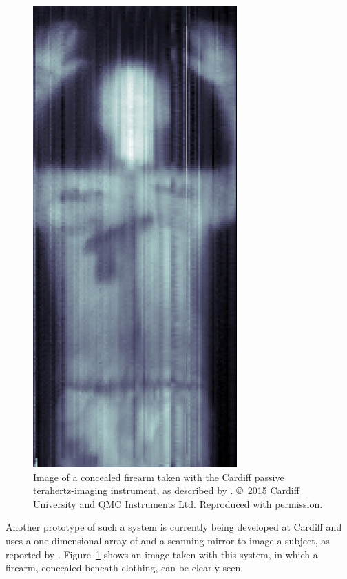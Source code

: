 \par 
\begin{figure}[tb]
\begin{center}
\includegraphics[height = 0.4\textheight]{figures/kidCAM_image}
\caption[Image of a concealed firearm taken with the Cardiff passive terahertz-imaging instrument]{Image of a concealed firearm taken with the Cardiff passive terahertz-imaging instrument, as described by \textcite{Rowe2015}. \copyright~2015 Cardiff University and QMC Instruments Ltd. Reproduced with permission.}
\label{fig:KIDcam}
\end{center}
\end{figure}
Another prototype of such a system is currently being developed at Cardiff and uses a one-dimensional array of  and a scanning mirror to image a subject, as reported by \textcite{Rowe2015}. Figure~\ref{fig:KIDcam} shows an image taken with this system, in which a firearm, concealed beneath clothing, can be clearly seen.
%
